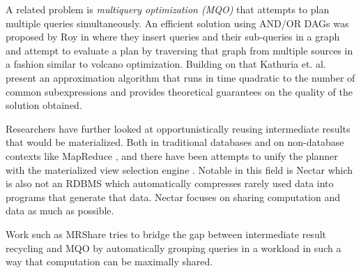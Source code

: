 A related problem is \emph{multiquery optimization (MQO)}
\cite{theodoratosDataWarehouseConfiguration1997} that attempts to plan
multiple queries simultaneously. An efficient solution using AND/OR
DAGs was proposed by Roy in
\cite{royEfficientExtensibleAlgorithms2000} where they insert queries
and their sub-queries in a graph and attempt to evaluate a plan by
traversing that graph from multiple sources in a fashion similar to
volcano optimization. Building on that Kathuria
et. al. \cite{kathuriaEfficientProvableMultiquery2017} present an
approximation algorithm that runs in time quadratic to the number of
common subexpressions and provides theoretical guarantees on the
quality of the solution obtained.

Researchers have further looked at opportunistically reusing
intermediate results that would be materialized. Both in traditional
databases
\cite{ivanovaArchitectureRecyclingIntermediates2010,nagelRecyclingPipelinedQuery2013}
and on non-database contexts like MapReduce
\cite{elghandourReStoreReusingResults2012a}, and there have been
attempts to unify the planner with the materialized view selection
engine \cite{perezHistoryawareQueryOptimization2014a}. Notable in this
field is Nectar \cite{gundaNectarAutomaticManagement2010} which is
also not an RDBMS which automatically compresses rarely used data into
programs that generate that data. Nectar focuses on sharing
computation and data as much as possible.

Work such as MRShare \cite{nykielMRShareSharingMultiple2010} tries to
bridge the gap between intermediate result recycling and MQO by
automatically grouping queries in a workload in such a way that
computation can be maximally shared.




